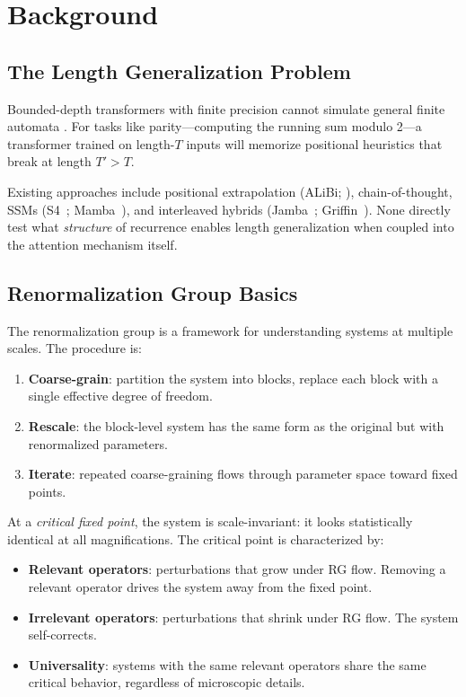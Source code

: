 \documentclass[11pt,a4paper]{article}
\begin{document}
\section{Background}
\label{sec:background}

\subsection{The Length Generalization Problem}

Bounded-depth transformers with finite precision cannot simulate
general finite automata \citep{merrill2023transformers}.  For tasks
like parity---computing the running sum modulo 2---a transformer
trained on length-$T$ inputs will memorize positional heuristics that
break at length $T' > T$.

Existing approaches include positional extrapolation (ALiBi;
\citealt{press2022alibi}), chain-of-thought, SSMs
(S4~\citealt{gu2022s4}; Mamba~\citealt{gu2023mamba}), and
interleaved hybrids (Jamba~\citealt{lieber2024jamba};
Griffin~\citealt{de2024griffin}).  None directly test what
\emph{structure} of recurrence enables length generalization when
coupled into the attention mechanism itself.

\subsection{Renormalization Group Basics}

The renormalization group \citep{kadanoff1966,wilson1971rg} is a
framework for understanding systems at multiple scales.  The
procedure is:

\begin{enumerate}
  \item \textbf{Coarse-grain}: partition the system into blocks,
    replace each block with a single effective degree of freedom.
  \item \textbf{Rescale}: the block-level system has the same form
    as the original but with renormalized parameters.
  \item \textbf{Iterate}: repeated coarse-graining flows through
    parameter space toward fixed points.
\end{enumerate}

At a \emph{critical fixed point}, the system is scale-invariant: it
looks statistically identical at all magnifications.  The critical
point is characterized by:
\begin{itemize}
  \item \textbf{Relevant operators}: perturbations that grow under
    RG flow.  Removing a relevant operator drives the system away
    from the fixed point.
  \item \textbf{Irrelevant operators}: perturbations that shrink
    under RG flow.  The system self-corrects.
  \item \textbf{Universality}: systems with the same relevant
    operators share the same critical behavior, regardless of
    microscopic details.
\end{itemize}
\end{document}
